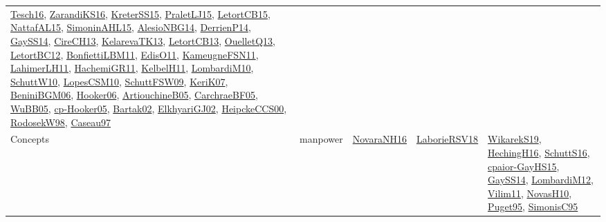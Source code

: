 {\begin{longtable}{llp{6cm}p{6cm}p{6cm}}
\href{papers/Tesch16.pdf}{Tesch16}\cite{Tesch16}, \href{articles/ZarandiKS16.pdf}{ZarandiKS16}\cite{ZarandiKS16}, \href{papers/KreterSS15.pdf}{KreterSS15}\cite{KreterSS15}, \href{papers/PraletLJ15.pdf}{PraletLJ15}\cite{PraletLJ15}, \href{articles/LetortCB15.pdf}{LetortCB15}\cite{LetortCB15}, \href{articles/NattafAL15.pdf}{NattafAL15}\cite{NattafAL15}, \href{articles/SimoninAHL15.pdf}{SimoninAHL15}\cite{SimoninAHL15}, \href{papers/AlesioNBG14.pdf}{AlesioNBG14}\cite{AlesioNBG14}, \href{papers/DerrienP14.pdf}{DerrienP14}\cite{DerrienP14}, \href{papers/GaySS14.pdf}{GaySS14}\cite{GaySS14}, \href{papers/CireCH13.pdf}{CireCH13}\cite{CireCH13}, \href{papers/KelarevaTK13.pdf}{KelarevaTK13}\cite{KelarevaTK13}, \href{papers/LetortCB13.pdf}{LetortCB13}\cite{LetortCB13}, \href{papers/OuelletQ13.pdf}{OuelletQ13}\cite{OuelletQ13}, \href{papers/LetortBC12.pdf}{LetortBC12}\cite{LetortBC12}, \href{papers/BonfiettiLBM11.pdf}{BonfiettiLBM11}\cite{BonfiettiLBM11}, \href{papers/EdisO11.pdf}{EdisO11}\cite{EdisO11}, \href{papers/KameugneFSN11.pdf}{KameugneFSN11}\cite{KameugneFSN11}, \href{papers/LahimerLH11.pdf}{LahimerLH11}\cite{LahimerLH11}, \href{articles/HachemiGR11.pdf}{HachemiGR11}\cite{HachemiGR11}, \href{articles/KelbelH11.pdf}{KelbelH11}\cite{KelbelH11}, \href{papers/LombardiM10.pdf}{LombardiM10}\cite{LombardiM10}, \href{papers/SchuttW10.pdf}{SchuttW10}\cite{SchuttW10}, \href{articles/LopesCSM10.pdf}{LopesCSM10}\cite{LopesCSM10}, \href{papers/SchuttFSW09.pdf}{SchuttFSW09}\cite{SchuttFSW09}, \href{papers/KeriK07.pdf}{KeriK07}\cite{KeriK07}, \href{papers/BeniniBGM06.pdf}{BeniniBGM06}\cite{BeniniBGM06}, \href{articles/Hooker06.pdf}{Hooker06}\cite{Hooker06}, \href{papers/ArtiouchineB05.pdf}{ArtiouchineB05}\cite{ArtiouchineB05}, \href{papers/CarchraeBF05.pdf}{CarchraeBF05}\cite{CarchraeBF05}, \href{papers/WuBB05.pdf}{WuBB05}\cite{WuBB05}, \href{papers/cp-Hooker05.pdf}{cp-Hooker05}\cite{cp-Hooker05}, \href{papers/Bartak02.pdf}{Bartak02}\cite{Bartak02}, \href{papers/ElkhyariGJ02.pdf}{ElkhyariGJ02}\cite{ElkhyariGJ02}, \href{articles/HeipckeCCS00.pdf}{HeipckeCCS00}\cite{HeipckeCCS00}, \href{papers/RodosekW98.pdf}{RodosekW98}\cite{RodosekW98}, \href{papers/Caseau97.pdf}{Caseau97}\cite{Caseau97}\\
Concepts & manpower & \href{articles/NovaraNH16.pdf}{NovaraNH16}\cite{NovaraNH16} & \href{articles/LaborieRSV18.pdf}{LaborieRSV18}\cite{LaborieRSV18} & \href{articles/WikarekS19.pdf}{WikarekS19}\cite{WikarekS19}, \href{papers/HechingH16.pdf}{HechingH16}\cite{HechingH16}, \href{papers/SchuttS16.pdf}{SchuttS16}\cite{SchuttS16}, \href{papers/cpaior-GayHS15.pdf}{cpaior-GayHS15}\cite{cpaior-GayHS15}, \href{papers/GaySS14.pdf}{GaySS14}\cite{GaySS14}, \href{articles/LombardiM12.pdf}{LombardiM12}\cite{LombardiM12}, \href{papers/Vilim11.pdf}{Vilim11}\cite{Vilim11}, \href{articles/NovasH10.pdf}{NovasH10}\cite{NovasH10}, \href{papers/Puget95.pdf}{Puget95}\cite{Puget95}, \href{papers/SimonisC95.pdf}{SimonisC95}\cite{SimonisC95}\\

\end{longtable}}
